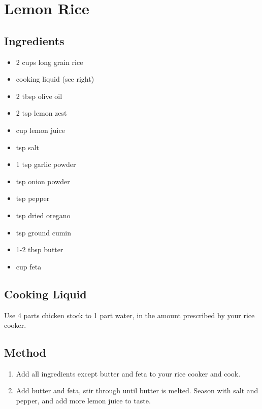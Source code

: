 \clearpage
\section{Lemon Rice}

\begin{multicols}{2}
  \subsection{Ingredients}
    \begin{itemize}
      \item 2 cups long grain rice
      \item cooking liquid (see right)
      \item 2 tbsp olive oil
      \item 2 tsp lemon zest
      \item {} cup lemon juice
      \item {} tsp salt
      \item 1 tsp garlic powder
      \item {} tsp onion powder
      \item {} tsp pepper
      \item {} tsp dried oregano
      \item {} tsp ground cumin
      \item 1-2 tbsp butter
      \item {} cup feta
    \end{itemize}
  \vfill\null
  \columnbreak
  \subsection{Cooking Liquid}
  Use 4 parts chicken stock to 1 part water, in the amount prescribed by your rice cooker.

  \subsection{Method}
    \begin{enumerate}
      \item Add all ingredients except butter and feta to your rice cooker and cook.
      \item Add butter and feta, stir through until butter is melted. Season with salt and pepper, and add more lemon juice to taste.
    \end{enumerate}
  \end{multicols}
